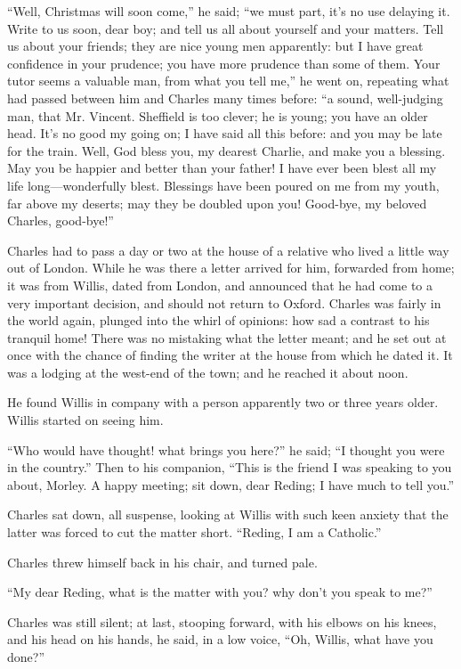 ``Well, Christmas will soon come,'' he said; ``we must
part, it's no use delaying it. Write to us soon, dear boy; and tell us
all about yourself and your matters. Tell us about your friends; they
are nice young men apparently: but I have great confidence in your
prudence; you have more prudence than some of them. Your tutor seems a
valuable man, from what you tell me,'' he went on, repeating what
had passed between him and Charles many times before: ``a sound,
well-judging man, that Mr. Vincent. Sheffield is too clever; he is
young; you have an older head. It's no good my going on; I have said
all this before: and you may be late for the train. Well, God
bless you, my dearest Charlie, and make you a blessing. May you be
happier and better than your father! I have ever been blest all my
life long—wonderfully blest. Blessings have been poured on me from
my youth, far above my deserts; may they be doubled upon you!
Good-bye, my beloved Charles, good-bye!''

Charles had to pass a day or two at the house of a relative who
lived a little way out of London. While he was there a letter arrived
for him, forwarded from home; it was from Willis, dated from London,
and announced that he had come to a very important decision, and
should not return to Oxford. Charles was fairly in the world again,
plunged into the whirl of opinions: how sad a contrast to his tranquil
home! There was no mistaking what the letter meant; and he set out at
once with the chance of finding the writer at the house from which he
dated it. It was a lodging at the west-end of the town; and he reached
it about noon.

He found Willis in company with a person apparently two or three
years older. Willis started on seeing him.

``Who would have thought! what brings you here?'' he said;
``I thought you were in the country.'' Then to his companion,
``This is the friend I was speaking to you about, Morley. A happy
meeting; sit down, dear Reding; I have much to tell you.''

Charles sat down, all suspense, looking at Willis with such keen
anxiety that the latter was forced to cut the matter short. ``Reding,
I am a Catholic.''

Charles threw himself back in his chair, and turned pale.

``My dear Reding, what is the matter with you? why don't you
speak to me?''

Charles was still silent; at last, stooping forward, with his
elbows on his knees, and his head on his hands, he said, in a low
voice, ``Oh, Willis, what have you done?''

